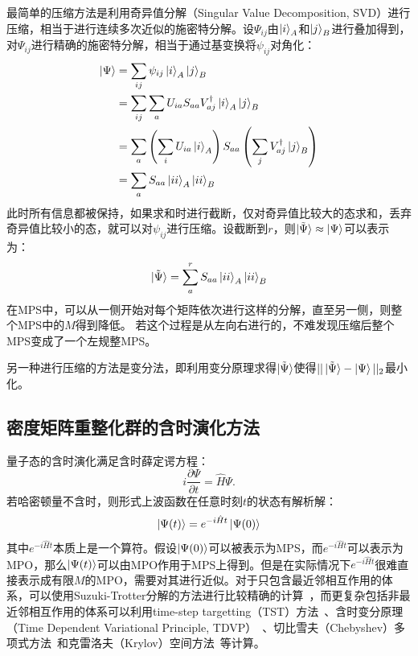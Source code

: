 \documentclass{article}
\begin{document}
最简单的压缩方法是利用奇异值分解（Singular Value Decomposition, SVD）进行压缩，相当于进行连续多次近似的施密特分解。设$\Psi_{ij}$由$\ket{i}_A$和$\ket{j}_B$进行叠加得到，对$\Psi_{ij}$进行精确的施密特分解，相当于通过基变换将$\psi_{ij}$对角化：
\begin{equation}
    \begin{aligned}
        \ket{\Psi} & = \sum_{ij} \psi_{ij} \ket{i}_A \ket{j}_B \\
        & = \sum_{ij} \sum_a U_{ia}S_{aa}V_{aj}^{\dag} \ket{i}_A \ket{j}_B \\
        & = \sum_a \left ( \sum_i U_{ia} \ket{i}_A \right ) S_{aa} \left ( \sum_j V_{aj}^{\dag} \ket{j}_B \right ) \\
        & = \sum_a S_{aa} \ket{ii}_A \ket{ii}_B
    \end{aligned}
\end{equation}
此时所有信息都被保持，如果求和时进行截断，仅对奇异值比较大的态求和，丢弃奇异值比较小的态，就可以对$\psi_{ij}$进行压缩。设截断到$r$，则$\ket{\tilde \Psi} \approx \ket{\Psi}$可以表示为：
\begin{equation}
    \ket{\tilde \Psi} = \sum_a^r S_{aa} \ket{ii}_A \ket{ii}_B
\end{equation}
在MPS中，可以从一侧开始对每个矩阵依次进行这样的分解，直至另一侧，则整个MPS中的$M$得到降低。
若这个过程是从左向右进行的，不难发现压缩后整个MPS变成了一个左规整MPS。

另一种进行压缩的方法是变分法，即利用变分原理求得$\ket{\tilde \Psi}$使得$||\ket{\tilde \Psi} - \ket{\Psi}||_2$最小化。

\subsection{密度矩阵重整化群的含时演化方法}
\label{ssec:dmrg-propagation}
量子态的含时演化满足含时薛定谔方程：
\begin{equation}
    i\frac{\partial \Psi}{\partial t} = \hat H \Psi.
\end{equation}
若哈密顿量不含时，则形式上波函数在任意时刻$t$的状态有解析解：
\begin{equation}
\label{eq:formal-schrodinger}
    \ket{\Psi(t)} = e^{-i\hat{H}t} \ket{\Psi(0)}
\end{equation}
其中$e^{-i\hat{H}t}$本质上是一个算符。假设$\ket{\Psi(0)}$可以被表示为MPS，而$e^{-i\hat{H}t}$可以表示为MPO，那么$\ket{\Psi(t)}$可以由MPO作用于MPS上得到。但是在实际情况下$e^{-i\hat{H}t}$很难直接表示成有限$M$的MPO，需要对其进行近似。对于只包含最近邻相互作用的体系，可以使用Suzuki-Trotter分解的方法进行比较精确的计算~\cite{Vidal04}，而更复杂包括非最近邻相互作用的体系可以利用time-step targetting（TST）方法~\cite{White05td, Garnet17}、含时变分原理（Time Dependent Variational Principle, TDVP）~\cite{Manthe92, Wang181, WANG182, LUBICH16}、切比雪夫（Chebyshev）多项式方法~\cite{Holzner11, Halimeh15}和克雷洛夫（Krylov）空间方法~\cite{Scholl05}等计算。
\end{document}
